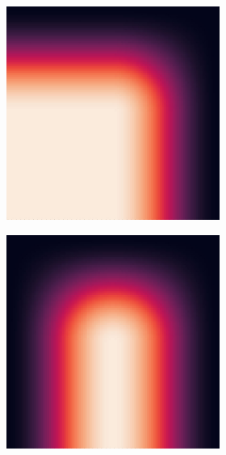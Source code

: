 \begin{figure}
\begin{subfigure}{0.5\textwidth}
\begin{subfigure}{.32\textwidth}
    \end{subfigure}
    \begin{subfigure}{.32\textwidth}
      \centering
      \includegraphics[width=\textwidth]{Images/hann_window_02.jpg}
    \end{subfigure}
    \begin{subfigure}{.32\textwidth}
      \centering
      \includegraphics[width=\textwidth]{Images/hann_window_12.jpg}

\end{subfigure}
\end{subfigure}
\end{figure}
